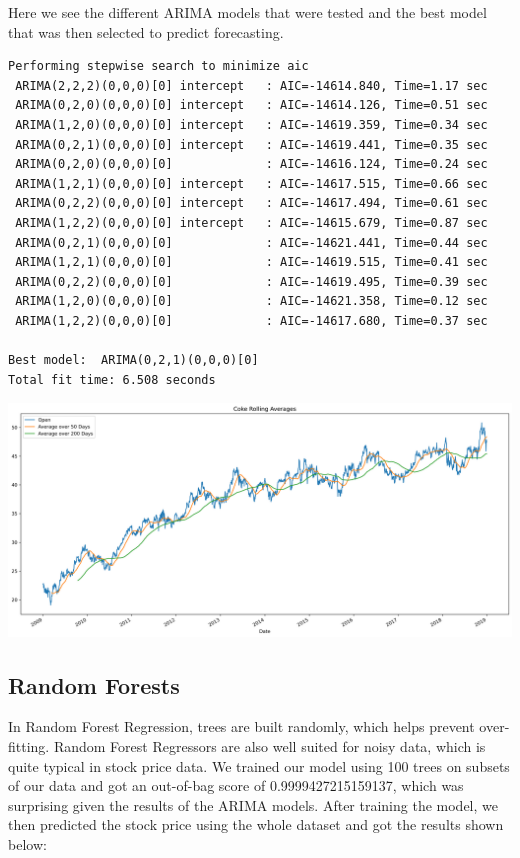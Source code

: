 \documentclass[11pt]{article}
\begin{document}
Here we see the different ARIMA models that were tested and the best model that was then selected to predict forecasting.

\begin{verbatim}
Performing stepwise search to minimize aic
 ARIMA(2,2,2)(0,0,0)[0] intercept   : AIC=-14614.840, Time=1.17 sec
 ARIMA(0,2,0)(0,0,0)[0] intercept   : AIC=-14614.126, Time=0.51 sec
 ARIMA(1,2,0)(0,0,0)[0] intercept   : AIC=-14619.359, Time=0.34 sec
 ARIMA(0,2,1)(0,0,0)[0] intercept   : AIC=-14619.441, Time=0.35 sec
 ARIMA(0,2,0)(0,0,0)[0]             : AIC=-14616.124, Time=0.24 sec
 ARIMA(1,2,1)(0,0,0)[0] intercept   : AIC=-14617.515, Time=0.66 sec
 ARIMA(0,2,2)(0,0,0)[0] intercept   : AIC=-14617.494, Time=0.61 sec
 ARIMA(1,2,2)(0,0,0)[0] intercept   : AIC=-14615.679, Time=0.87 sec
 ARIMA(0,2,1)(0,0,0)[0]             : AIC=-14621.441, Time=0.44 sec
 ARIMA(1,2,1)(0,0,0)[0]             : AIC=-14619.515, Time=0.41 sec
 ARIMA(0,2,2)(0,0,0)[0]             : AIC=-14619.495, Time=0.39 sec
 ARIMA(1,2,0)(0,0,0)[0]             : AIC=-14621.358, Time=0.12 sec
 ARIMA(1,2,2)(0,0,0)[0]             : AIC=-14617.680, Time=0.37 sec

Best model:  ARIMA(0,2,1)(0,0,0)[0]          
Total fit time: 6.508 seconds
\end{verbatim}

\includegraphics[width=\textwidth]{../images/rolling_average.pdf}

\subsection{Random Forests}
In Random Forest Regression, trees are built randomly, which helps prevent over-fitting. Random Forest Regressors are also well 
suited for noisy data, which is quite typical in stock price data. We trained our model using 100 trees on subsets of our data 
and got an out-of-bag score of 0.9999427215159137, which was surprising given the results of the ARIMA models. After training the 
model, we then predicted the stock price using the whole dataset and got the results shown below:
\end{document}
